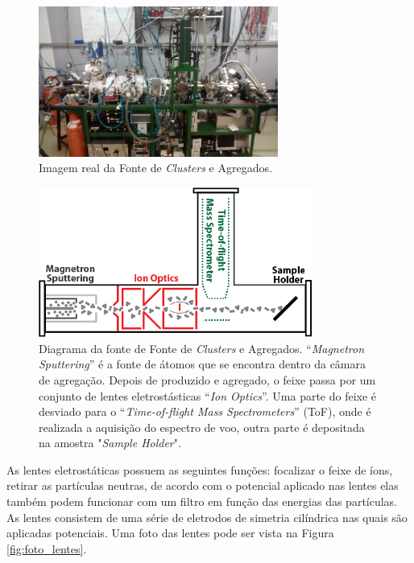 \begin{figure}
  \centering
  \includegraphics[width=0.7\textwidth]{images/foca/foto_foca}
  \caption{ Imagem real da  Fonte de \textit{Clusters} e Agregados.  }
  \label{fig:foto_foca}
\end{figure}

\begin{figure}
  \centering
  \includegraphics[width=0.8\textwidth]{images/foca/esquematico_foca}
  \caption{ Diagrama da fonte de Fonte de \textit{Clusters} e Agregados. ``\textit{Magnetron Sputtering}'' é a fonte de átomos que se encontra dentro da câmara de agregação. Depois de produzido e agregado, o feixe passa por um conjunto de lentes eletrostásticas  ``\textit{Ion Optics}''. Uma parte do feixe é desviado para o ``\textit{Time-of-flight Mass Spectrometers}'' (ToF), onde é realizada a aquisição do espectro de voo, outra parte é depositada na amostra "\textit{Sample Holder}"\cite{livro_vitor}.  }
  \label{fig:esquema_foca}
\end{figure}

As lentes eletrostáticas possuem as seguintes funções: focalizar o feixe de íons, retirar as partículas neutras, de acordo com o potencial aplicado nas lentes elas também podem funcionar com um filtro em função das energias das partículas. As lentes consistem de uma série de eletrodos de simetria cilíndrica nas quais são aplicadas potenciais. Uma foto das lentes pode ser vista na Figura \ref{fig:foto_lentes}.

